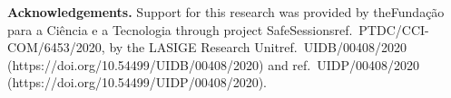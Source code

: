\documentclass[runningheads,dvipsnames]{llncs}
\begin{document}
\medskip

\noindent \textbf{Acknowledgements.} Support for this research was provided by the\linebreak Fundação para a Ciência e a Tecnologia through project SafeSessions\linebreak ref.\ PTDC/CCI-COM/6453/2020, by the LASIGE Research Unit\linebreak ref.\ UIDB/00408/2020 (https://doi.org/10.54499/UIDB/00408/2020) and ref.\ UIDP/00408/2020 (https://doi.org/10.54499/UIDP/00408/2020).

%
%
%


\end{document}

